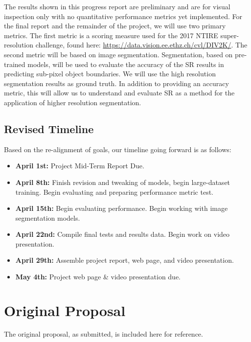 \documentclass{article}
\begin{document}
The results shown in this progress report are preliminary and are for visual inspection only with no quantitative performance metrics yet implemented. For the final report and the remainder of the project, we will use two primary metrics. The first metric is a scoring measure used for the 2017 NTIRE super-resolution challenge, found here: \url{https://data.vision.ee.ethz.ch/cvl/DIV2K/}. The second metric will be based on image segmentation. Segmentation, based on pre-trained models, will be used to evaluate the accuracy of the SR results in predicting sub-pixel object boundaries. We will use the high resolution segmentation results as ground truth. In addition to providing an accuracy metric, this will allow us to understand and evaluate SR as a method for the application of higher resolution segmentation.

\subsection{Revised Timeline}
Based on the re-alignment of goals, our timeline going forward is as follows:

\begin{itemize}
    \item \textbf{April 1st:} Project Mid-Term Report Due.
    \item \textbf{April 8th:} Finish revision and tweaking of models, begin large-dataset training. Begin evaluating and preparing performance metric test.
    \item \textbf{April 15th:} Begin evaluating performance. Begin working with image segmentation models.
    \item \textbf{April 22nd:} Compile final tests and results data. Begin work on video presentation.
    \item \textbf{April 29th:} Assemble project report, web page, and video presentation.
    \item \textbf{May 4th:} Project web page \& video presentation due.
\end{itemize}

\appendix

\section{Original Proposal}\label{app:proposal}

The original proposal, as submitted, is included here for reference.
\end{document}
